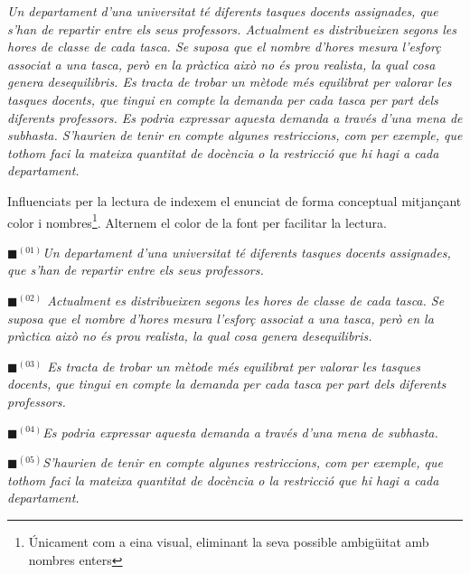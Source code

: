 \documentclass[10pt,twocolumn]{article}
\begin{document}
\begin{tcolorbox}[colback=black!1,title=\textbf{Enunciat del problema},coltitle=black,colbacktitle=black!10]
\textit{
Un departament d'una universitat té diferents tasques docents assignades, que s'han de repartir entre els seus professors. Actualment es distribueixen segons les hores de classe de cada tasca. Se suposa que el nombre d'hores mesura l'esforç associat a una tasca, però en la pràctica això no és prou realista, la qual cosa genera desequilibris. Es tracta de trobar un mètode més equilibrat per valorar les tasques docents, que tingui en compte la demanda per cada tasca per part dels diferents professors. Es podria expressar aquesta demanda a través d'una mena de subhasta. S'haurien de tenir en compte algunes restriccions, com per exemple, que tothom faci la mateixa quantitat de docència o la restricció que hi hagi a cada departament.
}
\end{tcolorbox}
Influenciats per la lectura de \cite{tah} indexem el enunciat de forma conceptual mitjançant color i nombres\footnote{Únicament com a eina visual, eliminant la seva possible ambigüitat amb nombres enters}. Alternem el color de la font per facilitar la lectura. 
\newline
\begin{tcolorbox}[colback=black!1,title=\textbf{Enunciat del problema},coltitle=black,colbacktitle=black!10]

\textit{{\color{cyan!60}$\blacksquare$}$^{(01)}${\color{black!80}Un departament d'una universitat té diferents tasques docents assignades, que s'han de repartir entre els seus professors.}}
 
\textit{{\color{blue!60}$\blacksquare$}$^{(02)}$ Actualment es distribueixen segons les hores de classe de cada tasca. Se suposa que el nombre d'hores mesura l'esforç associat a una tasca, però en la pràctica això no és prou realista, la qual cosa genera desequilibris.}

\textit{{\color{green!60}$\blacksquare$}$^{(03)}$ {\color{black!80}Es tracta de trobar un mètode més equilibrat per valorar les tasques docents, que tingui en compte la demanda per cada tasca per part dels diferents professors.}}
 
\textit{{\color{purple!60}$\blacksquare$}$^{(04)}$Es podria expressar aquesta demanda a través d'una mena de subhasta.}
 
\textit{{\color{violet!60}$\blacksquare$}$^{(05)}${\color{black!80}S'haurien de tenir en compte algunes restriccions, com per exemple, que tothom faci la mateixa quantitat de docència o la restricció que hi hagi a cada departament.}}

\end{tcolorbox}
\end{document}
